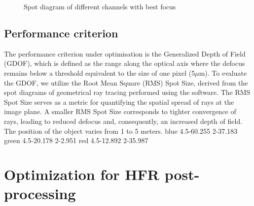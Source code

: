 \documentclass[10pt,letterpaper]{article}
\begin{document}
\begin{figure}[h]
    \centering
	\caption{Spot diagram of different channels with best focus}
    \label{fig:Spot_diagram_bf}
\end{figure}

\subsection{Performance criterion}
The performance criterion under optimisation is the Generalized Depth of Field (GDOF), which is defined as the range along the optical axis where the defocus remains below a threshold equivalent to the size of one pixel (5$\mu$m). 
To evaluate the GDOF, we utilize the Root Mean Square (RMS) Spot Size, derived from the spot diagrams of geometrical ray tracing performed using the software. The RMS Spot Size serves as a metric for quantifying the spatial spread of rays at the image plane. A smaller RMS Spot Size corresponds to tighter convergence of rays, leading to reduced defocus and, consequently, an increased depth of field. 
The position of the object varies from 1 to 5 meters.
blue 4.5-60.255 2-37.183
green 4.5-20.178 2-2.951
red 4.5-12.892 2-35.987
\section{Optimization for HFR post-processing}














\listoffigures
\end{document}
